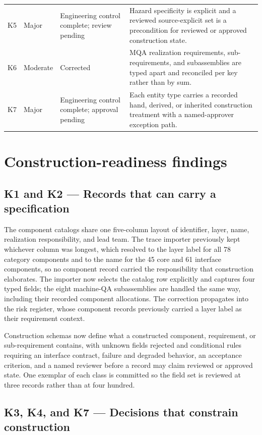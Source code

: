 \documentclass[11pt,letterpaper]{article}
\begin{document}
\begin{small}
\begin{longtable}{@{}L{0.07\textwidth}L{0.12\textwidth}L{0.31\textwidth}L{0.42\textwidth}@{}}
K5 & Major & Engineering control complete; review pending & Hazard specificity is explicit and a reviewed source-explicit set is a precondition for reviewed or approved construction state. \\
\addlinespace[2pt]
K6 & Moderate & Corrected & MQA realization requirements, sub-requirements, and subassemblies are typed apart and reconciled per key rather than by sum. \\
\addlinespace[2pt]
K7 & Major & Engineering control complete; approval pending & Each entity type carries a recorded hand, derived, or inherited construction treatment with a named-approver exception path. \\
\end{longtable}
\end{small}

\section{Construction-readiness findings}

\subsection{K1 and K2 --- Records that can carry a specification}

The component catalogs share one five-column layout of identifier, layer, name,
realization responsibility, and lead team. The trace importer previously kept whichever
column was longest, which resolved to the layer label for all 78 category components and
to the name for the 45 core and 61 interface components, so no component record carried
the responsibility that construction elaborates. The importer now selects the catalog row
explicitly and captures four typed fields; the eight machine-QA subassemblies are handled
the same way, including their recorded component allocations. The correction propagates
into the risk register, whose component records previously carried a layer label as their
requirement context.

Construction schemas now define what a constructed component, requirement, or
sub-requirement contains, with unknown fields rejected and conditional rules requiring an
interface contract, failure and degraded behavior, an acceptance criterion, and a named
reviewer before a record may claim reviewed or approved state. One exemplar of each class
is committed so the field set is reviewed at three records rather than at four hundred.

\subsection{K3, K4, and K7 --- Decisions that constrain construction}
\end{document}
